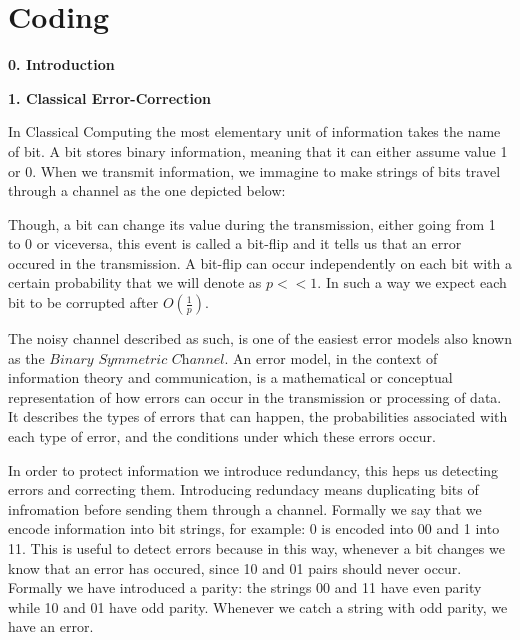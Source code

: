 \documentclass[12pt]{report}
\begin{document}
	
	\begin{minipage}{1 \textwidth}	
	\end{minipage}
	












 
	\chapter{Coding}
	\begin{minipage}{1 \textwidth}
		
		\textbf{0. Introduction}\newline
		
		\textbf{1. Classical Error-Correction}\newline
		
		In Classical Computing the most elementary unit of information takes the name of bit. A bit stores binary information, meaning that it can either assume value 1 or 0. When we transmit information, we immagine to make strings of bits travel through a channel as the one depicted below: \newline
		
		
		
		Though, a bit can change its value during the transmission, either going from 1 to 0 or viceversa, this event is called a bit-flip and it tells us that an error occured in the transmission. A bit-flip can occur independently on each bit with a certain probability that we will denote as $p << 1$. In such a way we expect each bit to be corrupted after $O(\frac{1}{p})$. \newline
		
		The noisy channel described as such, is one of the easiest error models also known as the $\textit{Binary Symmetric Channel}$. An error model, in the context of information theory and communication, is a mathematical or conceptual representation of how errors can occur in the transmission or processing of data. It describes the types of errors that can happen, the probabilities associated with each type of error, and the conditions under which these errors occur. \newline
		
		In order to protect information we introduce redundancy, this heps us detecting errors and correcting them. 
		Introducing redundacy means duplicating bits of infromation before sending them through a channel. Formally we say that we encode information into bit strings, for example: 0 is encoded into 00 and 1 into 11. This is useful to detect errors because in this way, whenever a bit changes we know that an error has occured, since 10 and 01 pairs should never occur. Formally we have introduced a parity: the strings 00 and 11 have even parity while 10 and 01 have odd parity. Whenever we catch a string with odd parity, we have an error.		\newline
		

\end{minipage}
\end{document}
